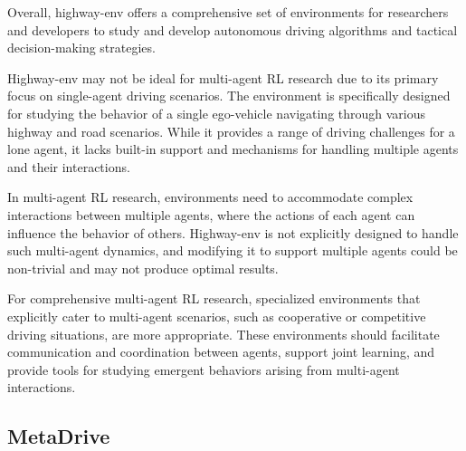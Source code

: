 Overall, highway-env offers a comprehensive set of environments for researchers and developers to study and develop autonomous driving algorithms and tactical decision-making strategies.

Highway-env may not be ideal for multi-agent RL research due to its primary focus on single-agent driving scenarios. The environment is specifically designed for studying the behavior of a single ego-vehicle navigating through various highway and road scenarios. While it provides a range of driving challenges for a lone agent, it lacks built-in support and mechanisms for handling multiple agents and their interactions.

In multi-agent RL research, environments need to accommodate complex interactions between multiple agents, where the actions of each agent can influence the behavior of others. Highway-env is not explicitly designed to handle such multi-agent dynamics, and modifying it to support multiple agents could be non-trivial and may not produce optimal results.

For comprehensive multi-agent RL research, specialized environments that explicitly cater to multi-agent scenarios, such as cooperative or competitive driving situations, are more appropriate. These environments should facilitate communication and coordination between agents, support joint learning, and provide tools for studying emergent behaviors arising from multi-agent interactions.

\subsection{MetaDrive}\label{subsec:metadrive}
